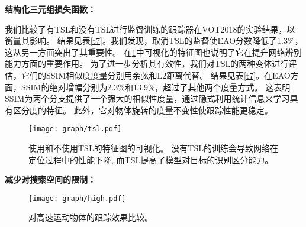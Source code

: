 \documentclass[promaster]{thesis-uestc}
\begin{document}
\noindent
\textbf{结构化三元组损失函数：}

我们比较了有TSL和没有TSL进行监督训练的跟踪器在VOT2018的实验结果，以衡量其影响。
结果见表\ref{t7}。我们发现，取消TSL的监督使EAO分数降低了1.3\%，这从另一方面突出了其重要性。
在\ref{tsl}中可视化的特征图也说明了它在提升网络辨别能力方面的重要作用。
为了进一步分析其有效性，我们对TSL的两种变体进行评估，它们的SSIM相似度度量分别用余弦和L2距离代替。
结果见表\ref{t7}。在EAO方面，SSIM的绝对增幅分别为2.3\%和13.9\%，超过了其他两个度量方式。
这表明SSIM为两个分支提供了一个强大的相似性度量，通过隐式利用统计信息来学习具有区分度的特征。
此外，它对物体旋转的度量不变性使跟踪性能更稳定。

\begin{table}[htp!]
    \caption{在VOT2018数据集上对TSL相似度度量方式的消融实验比较。
     }
    \begin{center}
    \end{center}
    
    \label{t7}
\end{table}

\begin{figure}[htp!]
    \begin{center}
    \texttt{[image: graph/tsl.pdf]}
    \end{center}
      \caption{使用和不使用TSL的特征图的可视化。 
      没有TSL的训练会导致网络在定位过程中的性能下降, 
      而TSL提高了模型对目标的识别区分能力。}
    \label{tsl}
\end{figure}


    
\noindent
\textbf{减少对搜索空间的限制：}

\begin{figure}[htp!]
    \begin{center}
    \texttt{[image: graph/high.pdf]}
    \end{center}
       \caption{对高速运动物体的跟踪效果比较。}
    \label{high}
\end{figure}
\end{document}
